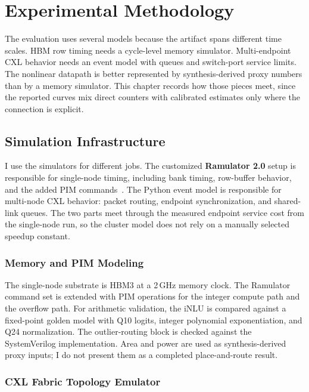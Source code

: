 \chapter{Experimental Methodology}
\label{ch:methodology}

The evaluation uses several models because the artifact spans different time scales. HBM row timing needs a cycle-level memory simulator. Multi-endpoint CXL behavior needs an event model with queues and switch-port service limits. The nonlinear datapath is better represented by synthesis-derived proxy numbers than by a memory simulator. This chapter records how those pieces meet, since the reported curves mix direct counters with calibrated estimates only where the connection is explicit.

\section{Simulation Infrastructure}

I use the simulators for different jobs. The customized \textbf{Ramulator 2.0} setup is responsible for single-node timing, including bank timing, row-buffer behavior, and the added PIM commands~\cite{ramulator2}. The Python event model is responsible for multi-node CXL behavior: packet routing, endpoint synchronization, and shared-link queues. The two parts meet through the measured endpoint service cost from the single-node run, so the cluster model does not rely on a manually selected speedup constant.

\subsection{Memory and PIM Modeling}

The single-node substrate is HBM3 at a 2\,GHz memory clock. The Ramulator command set is extended with PIM operations for the integer compute path and the overflow path. For arithmetic validation, the iNLU is compared against a fixed-point golden model with Q10 logits, integer polynomial exponentiation, and Q24 normalization. The outlier-routing block is checked against the SystemVerilog implementation. Area and power are used as synthesis-derived proxy inputs; I do not present them as a completed place-and-route result.

\subsection{CXL Fabric Topology Emulator}

